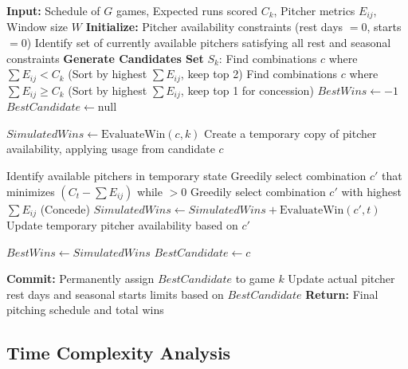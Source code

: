 \documentclass[11pt, a4paper]{article}
\begin{document}
\begin{algorithm}[H]
\caption{Lookahead Minimal-Slack Heuristic}
\label{alg:heuristic}
\begin{algorithmic}[1]
\State \textbf{Input:} Schedule of $G$ games, Expected runs scored $C_k$, Pitcher metrics $E_{ij}$, Window size $W$
\State \textbf{Initialize:} Pitcher availability constraints (rest days $= 0$, starts $= 0$)
    \State Identify set of currently available pitchers satisfying all rest and seasonal constraints
    \State \textbf{Generate Candidates Set} $S_k$:
    \State \quad Find combinations $c$ where $\sum E_{ij} < C_k$ (Sort by highest $\sum E_{ij}$, keep top 2)
    \State \quad Find combinations $c$ where $\sum E_{ij} \ge C_k$ (Sort by highest $\sum E_{ij}$, keep top 1 for concession)
    \State $BestWins \gets -1$
    \State $BestCandidate \gets \text{null}$

        \State $SimulatedWins \gets \text{EvaluateWin}(c, k)$
        \State Create a temporary copy of pitcher availability, applying usage from candidate $c$

            \State Identify available pitchers in temporary state
            \State Greedily select combination $c'$ that minimizes $(C_t - \sum E_{ij})$ while $> 0$
                \State Greedily select combination $c'$ with highest $\sum E_{ij}$ (Concede)
            \EndIf
            \State $SimulatedWins \gets SimulatedWins + \text{EvaluateWin}(c', t)$
            \State Update temporary pitcher availability based on $c'$
        \EndFor

            \State $BestWins \gets SimulatedWins$
            \State $BestCandidate \gets c$
        \EndIf
    \EndFor

    \State \textbf{Commit:} Permanently assign $BestCandidate$ to game $k$
    \State Update actual pitcher rest days and seasonal starts limits based on $BestCandidate$
\EndFor
\State \textbf{Return:} Final pitching schedule and total wins
\end{algorithmic}
\end{algorithm}

\subsection{Time Complexity Analysis}
\end{document}
